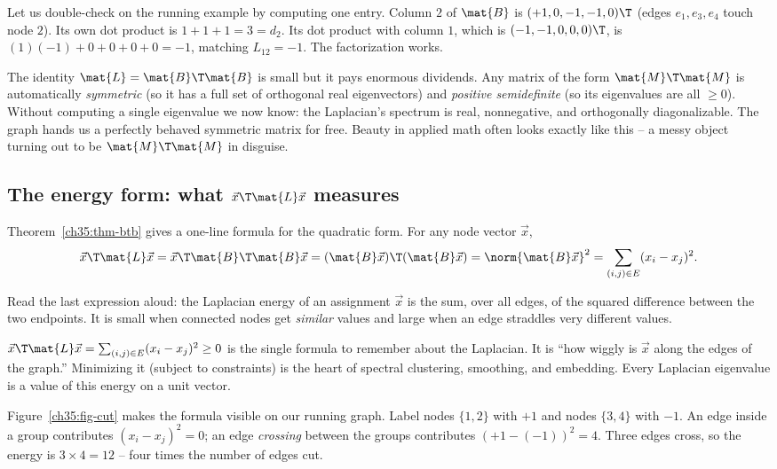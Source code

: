 Let us double-check on the running example by computing one entry. Column $2$ of $\mat{B}$
is $(+1,0,-1,-1,0)\T$ (edges $e_1,e_3,e_4$ touch node $2$). Its own dot product is
$1+1+1 = 3 = d_2$. Its dot product with column $1$, which is $(-1,-1,0,0,0)\T$, is
$(1)(-1) + 0 + 0 + 0 + 0 = -1$, matching $L_{12} = -1$. The factorization works.

\begin{aestheticbox}
The identity $\mat{L} = \mat{B}\T\mat{B}$ is small but it pays enormous dividends. Any
matrix of the form $\mat{M}\T\mat{M}$ is automatically \emph{symmetric} (so it has a full
set of orthogonal real eigenvectors) and \emph{positive semidefinite} (so its eigenvalues
are all $\ge 0$). Without computing a single eigenvalue we now know: the Laplacian's
spectrum is real, nonnegative, and orthogonally diagonalizable. The graph hands us a
perfectly behaved symmetric matrix for free. Beauty in applied math often looks exactly
like this -- a messy object turning out to be $\mat{M}\T\mat{M}$ in disguise.
\end{aestheticbox}

\subsection{The energy form: what $\vec{x}\T \mat{L}\vec{x}$ measures}

Theorem~\ref{ch35:thm-btb} gives a one-line formula for the quadratic form. For any node
vector $\vec{x}$,
\[
\vec{x}\T \mat{L}\vec{x}
= \vec{x}\T \mat{B}\T \mat{B}\vec{x}
= (\mat{B}\vec{x})\T(\mat{B}\vec{x})
= \norm{\mat{B}\vec{x}}^2
= \sum_{(i,j)\in E} (x_i - x_j)^2.
\]

Read the last expression aloud: the Laplacian energy of an assignment $\vec{x}$ is the sum,
over all edges, of the squared difference between the two endpoints. It is small when
connected nodes get \emph{similar} values and large when an edge straddles very different
values.

\begin{focusbox}
$\vec{x}\T\mat{L}\vec{x} = \sum_{(i,j)\in E}(x_i - x_j)^2 \ge 0$ is the single formula to
remember about the Laplacian. It is ``how wiggly is $\vec{x}$ along the edges of the
graph.'' Minimizing it (subject to constraints) is the heart of spectral clustering,
smoothing, and embedding. Every Laplacian eigenvalue is a value of this energy on a
unit vector.
\end{focusbox}

Figure~\ref{ch35:fig-cut} makes the formula visible on our running graph. Label nodes
$\{1,2\}$ with $+1$ and nodes $\{3,4\}$ with $-1$. An edge inside a group contributes
$(x_i-x_j)^2 = 0$; an edge \emph{crossing} between the groups contributes
$(+1-(-1))^2 = 4$. Three edges cross, so the energy is $3 \times 4 = 12$ -- four times the
number of edges cut.

